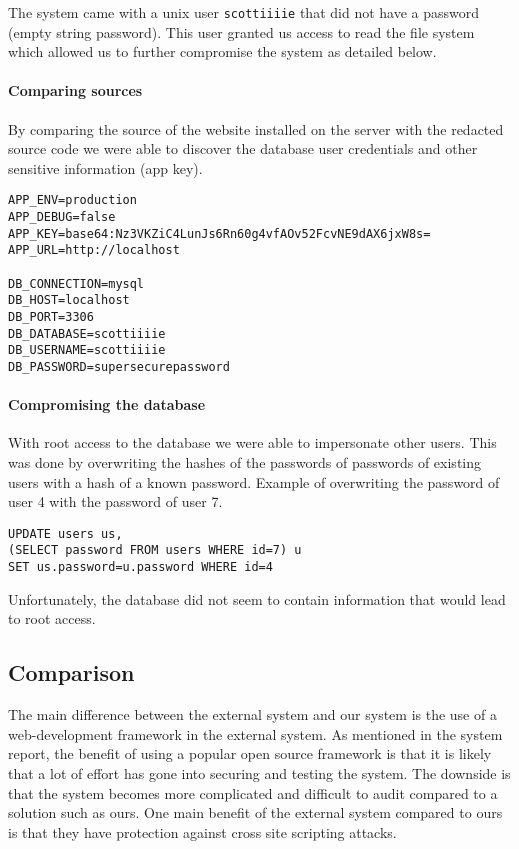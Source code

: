 \documentclass{article}
\begin{document}
The system came with a unix user \texttt{scottiiiie} that did not have a password (empty string password).
This user granted us access to read the file system which allowed us to further compromise the system as detailed below.

\paragraph{Comparing sources}
By comparing the source of the website installed on the server with the redacted source code we were able to discover the database user credentials and other sensitive information (app key).
\begin{verbatim}
APP_ENV=production
APP_DEBUG=false
APP_KEY=base64:Nz3VKZiC4LunJs6Rn60g4vfAOv52FcvNE9dAX6jxW8s=
APP_URL=http://localhost

DB_CONNECTION=mysql
DB_HOST=localhost
DB_PORT=3306
DB_DATABASE=scottiiiie
DB_USERNAME=scottiiiie
DB_PASSWORD=supersecurepassword
\end{verbatim}

\paragraph{Compromising the database}
With root access to the database we were able to impersonate other users.
This was done by overwriting the hashes of the passwords of passwords of existing users with a hash of a known password.
Example of overwriting the password of user 4 with the password of user 7.
\begin{verbatim}
UPDATE users us,
(SELECT password FROM users WHERE id=7) u 
SET us.password=u.password WHERE id=4
\end{verbatim}
Unfortunately, the database did not seem to contain information that would lead to root access.

\subsection{Comparison}
The main difference between the external system and our system is the use of a web-development framework in the external system.
As mentioned in the system report, the benefit of using a popular open source framework is that it is likely that a lot of effort has gone into securing and testing the system.  
The downside is that the system becomes more complicated and difficult to audit compared to a solution such as ours.
One main benefit of the external system compared to ours is that they have protection against cross site scripting attacks.
\end{document}
